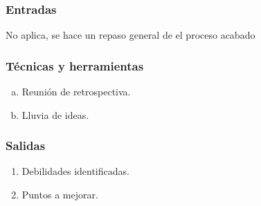 \subsubsection*{Entradas}
No aplica, se hace un repaso general de el proceso acabado

\subsubsection*{Técnicas y herramientas}
\begin{enumerate}[a.]
  \item Reunión de retrospectiva.
  \item Lluvia de ideas.
\end{enumerate}

\subsubsection*{Salidas}
\begin{enumerate}
  \item Debilidades identificadas.
  \item Puntos a mejorar.
\end{enumerate}
